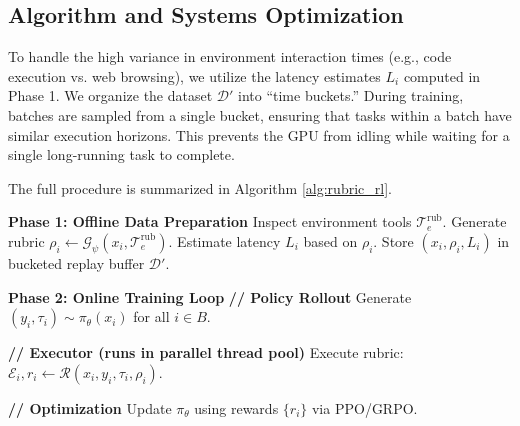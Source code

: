 \subsection{Algorithm and Systems Optimization}
\label{sec:algorithm}

To handle the high variance in environment interaction times (e.g., code execution vs. web browsing), we utilize the latency estimates $L_i$ computed in Phase 1.
We organize the dataset $\mathcal{D}'$ into ``time buckets.'' During training, batches are sampled from a single bucket, ensuring that tasks within a batch have similar execution horizons. This prevents the GPU from idling while waiting for a single long-running task to complete.

The full procedure is summarized in Algorithm \ref{alg:rubric_rl}.

\begin{algorithm}[h]
\caption{Agentic Rubric RL (Offline Synthesis + Online Training)}
\label{alg:rubric_rl}
\begin{algorithmic}[1]
\State \textbf{Phase 1: Offline Data Preparation}
    \State Inspect environment tools $\mathcal{T}_e^{\text{rub}}$.
    \State Generate rubric $\rho_i \leftarrow \mathcal{G}_\psi(x_i, \mathcal{T}_e^{\text{rub}})$.
    \State Estimate latency $L_i$ based on $\rho_i$.
    \State Store $(x_i, \rho_i, L_i)$ in bucketed replay buffer $\mathcal{D}'$.
\EndFor

\State \textbf{Phase 2: Online Training Loop}
        \State \textbf{// Policy Rollout}
        \State Generate $(y_i, \tau_i) \sim \pi_\theta(x_i)$ for all $i \in B$.
        
        \State \textbf{// Executor (runs in parallel thread pool)}
            \State Execute rubric: $\mathcal{E}_i, r_i \leftarrow \mathcal{R}(x_i, y_i, \tau_i, \rho_i)$.
        \EndFor
        
        \State \textbf{// Optimization}
        \State Update $\pi_\theta$ using rewards $\{r_i\}$ via PPO/GRPO.
    \EndFor
\EndFor
\end{algorithmic}
\end{algorithm}